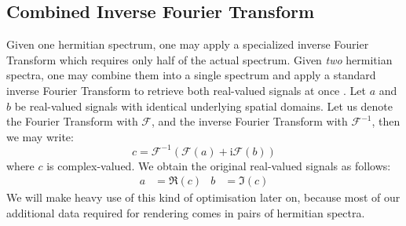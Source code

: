 \subsection{Combined Inverse Fourier Transform}
Given one hermitian spectrum, one may apply a specialized inverse Fourier Transform
which requires only half of the actual spectrum. Given \emph{two} hermitian spectra,
one may combine them into a single spectrum and apply a standard inverse Fourier Transform
to retrieve both real-valued signals at once \citep{fft:handbook}.
Let $a$ and $b$ be real-valued signals with identical underlying spatial domains.
Let us denote the Fourier Transform with $\mathcal{F}$, and the inverse Fourier
Transform with $\mathcal{F}^{-1}$, then we may write:
\begin{equation}
\label{eq:idft:combined}
c = \mathcal{F}^{-1}(\mathcal{F}(a)+\mathrm{i}\mathcal{F}(b))
\end{equation}
where $c$ is complex-valued. We obtain the original real-valued signals as follows:
\begin{align*}
a &= \Re(c) & b &= \Im(c)
\end{align*}
%
We will make heavy use of this kind of optimisation later on, because most
of our additional data required for rendering comes in pairs of hermitian spectra.
